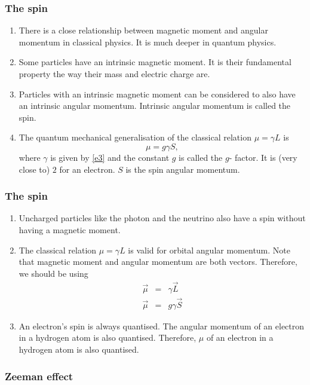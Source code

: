\documentclass{beamer}
\begin{document}
\begin{frame}
\frametitle{The spin}
\begin{enumerate}
\item There is a close relationship between magnetic moment and angular momentum
in classical physics. It is much deeper in quantum physics.
\item Some particles have an intrinsic magnetic moment. It is their fundamental
property the way their mass and electric charge are.
\item Particles with an intrinsic magnetic moment can be considered to also have
an intrinsic angular momentum. Intrinsic angular momentum is called the spin.
\item The quantum mechanical generalisation of the classical relation $\mu = 
\gamma L$ is
\begin{equation}\label{e7}
\mu = g\gamma S,
\end{equation}
where $\gamma$ is given by \eqref{e3} and the constant $g$ is called the $g$-
factor. It is (very close to) $2$ for an electron. $S$ is the spin angular 
momentum.
\end{enumerate}
\end{frame}

\begin{frame}
\frametitle{The spin}
\begin{enumerate}
\item Uncharged particles like the photon and the neutrino also have a spin 
without having a magnetic moment.
\item The classical relation $\mu = \gamma L$ is valid for orbital angular 
momentum. Note that magnetic moment and angular momentum are both vectors.
Therefore, we should be using
\begin{eqnarray}
\vec{\mu} &=& \gamma\vec{L} \label{e8} \\
\vec{\mu} &=& g\gamma\vec{S} \label{e9}
\end{eqnarray}
\item An electron's spin is always quantised. The angular momentum of an 
electron in a hydrogen atom is also quantised. Therefore, $\mu$ of an electron
in a hydrogen atom is also quantised.
\end{enumerate}
\end{frame}

\begin{frame}
\frametitle{Zeeman effect}
\begin{enumerate}
\end{enumerate}
\end{frame}
\end{document}
